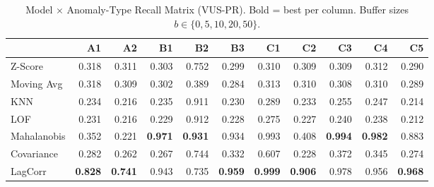 \begin{table}
\caption{Model $\times$ Anomaly-Type Recall Matrix (VUS-PR). Bold = best per column. Buffer sizes $b \in \{0,5,10,20,50\}$.}
\label{tab:recall_matrix}
\begin{tabular}{lrrrrrrrrrr}
\toprule
 & A1 & A2 & B1 & B2 & B3 & C1 & C2 & C3 & C4 & C5 \\
\midrule
Z-Score & 0.318 & 0.311 & 0.303 & 0.752 & 0.299 & 0.310 & 0.309 & 0.309 & 0.312 & 0.290 \\
Moving Avg & 0.318 & 0.309 & 0.302 & 0.389 & 0.284 & 0.313 & 0.310 & 0.308 & 0.310 & 0.289 \\
KNN & 0.234 & 0.216 & 0.235 & 0.911 & 0.230 & 0.289 & 0.233 & 0.255 & 0.247 & 0.214 \\
LOF & 0.231 & 0.216 & 0.229 & 0.912 & 0.228 & 0.275 & 0.227 & 0.240 & 0.238 & 0.212 \\
Mahalanobis & 0.352 & 0.221 & \textbf{0.971} & \textbf{0.931} & 0.934 & 0.993 & 0.408 & \textbf{0.994} & \textbf{0.982} & 0.883 \\
Covariance & 0.282 & 0.262 & 0.267 & 0.744 & 0.332 & 0.607 & 0.228 & 0.372 & 0.345 & 0.274 \\
LagCorr & \textbf{0.828} & \textbf{0.741} & 0.943 & 0.735 & \textbf{0.959} & \textbf{0.999} & \textbf{0.906} & 0.978 & 0.956 & \textbf{0.968} \\
\bottomrule
\end{tabular}
\end{table}
